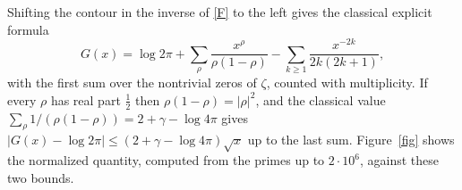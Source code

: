 \documentclass[11pt,letterpaper]{article}
\numberwithin{equation}{section}
\begin{document}
Shifting the contour in the inverse of \eqref{F} to the left gives the classical explicit formula
\[
G(x)=\log2\pi+\sum_\rho\frac{x^\rho}{\rho(1-\rho)}-\sum_{k\ge1}\frac{x^{-2k}}{2k(2k+1)},
\]
with the first sum over the nontrivial zeros of $\zeta$, counted with multiplicity. If every $\rho$ has real part $\tfrac12$ then $\rho(1-\rho)=|\rho|^2$, and the classical value $\sum_\rho1/(\rho(1-\rho))=2+\gamma-\log4\pi$ gives $|G(x)-\log2\pi|\le(2+\gamma-\log4\pi)\sqrt x$ up to the last sum. Figure~\ref{fig} shows the normalized quantity, computed from the primes up to $2\cdot10^6$, against these two bounds.

\begin{figure}[htbp]
\centering
{}
\end{figure}
\end{document}
